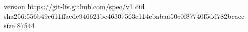 version https://git-lfs.github.com/spec/v1
oid sha256:556b49c611ffaede946621bc46307563e114cbabaa50e0f87740f5dd782bcace
size 87544
